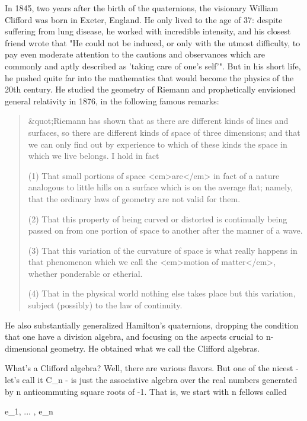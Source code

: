 In 1845, two years after the birth of the quaternions, the visionary
William Clifford was born in Exeter, England.  He only lived to
the age of 37: despite suffering from lung disease, he worked with
incredible intensity, and his closest friend wrote that "He could
not be induced, or only with the utmost difficulty, to pay even
moderate attention to the cautions and observances which are commonly
and aptly described as 'taking care of one's self'".  But
in his short life, he pushed quite far into the mathematics that
would become the physics of the 20th century.  He studied the geometry
of Riemann and prophetically envisioned general relativity in 1876, in
the following famous remarks:

\begin{quote}
&quot;Riemann has shown that as there are different kinds of lines and
surfaces, so there are different kinds of space of three dimensions; and
that we can only find out by experience to which of these kinds the
space in which we live belongs.  I hold in fact

(1) That small portions of space <em>are</em> in fact of a nature analogous
to little hills on a surface which is on the average flat; namely, that
the ordinary laws of geometry are not valid for them.

(2)  That this property of being curved or distorted is continually
being passed on from one portion of space to another after the manner of
a wave.

(3)  That this variation of the curvature of space is what really
happens in that phenomenon which we call the <em>motion of matter</em>,
whether ponderable or etherial.

(4)  That in the physical world nothing else takes place but this
variation, subject (possibly) to the law of continuity. 

\end{quote}
    
He also substantially generalized Hamilton's quaternions, dropping the
condition that one have a division algebra, and focusing on the aspects
crucial to n-dimensional geometry.  He obtained what we call the
Clifford algebras.  

What's a Clifford algebra?  Well, there are various flavors.  But one of
the nicest - let's call it C_{n} - is just the associative algebra
over the real numbers generated by n anticommuting square roots of -1.
That is, we start with n fellows called

e_{1}, ... , e_{n}

